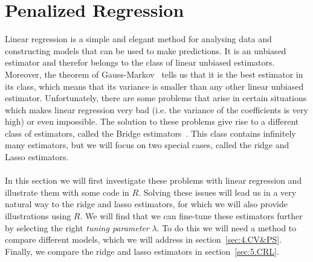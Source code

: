 \section{Penalized Regression} \label{sec:3.PR}
Linear regression is a simple and elegant method for analysing data and constructing models that can be used to make predictions. It is an unbiased estimator and therefor belongs to the class of linear unbiased estimators. Moreover, the theorem of Gauss-Markov~\cite{SIDA2021} tells us that it is the best estimator in its class, which means that its variance is smaller than any other linear unbiased estimator. Unfortunately, there are some problems that arise in certain situations which makes linear regression very bad (i.e. the variance of the coefficients is very high) or even impossible. The solution to these problems give rise to a different class of estimators, called the Bridge estimators~\cite{WWM2020}. This class contains infinitely many estimators, but we will focus on two special cases, called the ridge and Lasso estimators.\\
\\
In this section we will first investigate these problems with linear regression and illustrate them with some code in $R$. Solving these issues will lead us in a very natural way to the ridge and lasso estimators, for which we will also provide illustrations using $R$. We will find that we can fine-tune these estimators further by selecting the right \textit{tuning parameter} $\lambda$. To do this we will need a method to compare different models, which we will address in section~\ref{sec:4.CV&PS}. Finally, we compare the ridge and lasso estimators in section~\ref{sec:5.CRL}.


